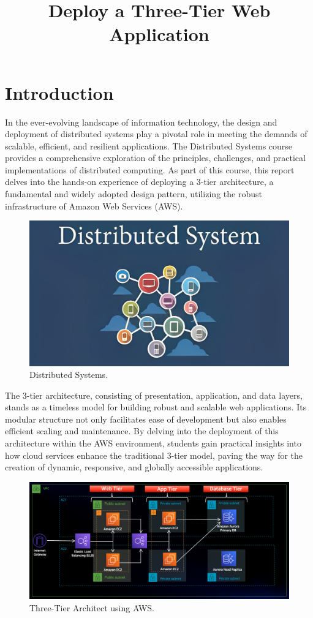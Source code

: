 \documentclass{article}
\title{\huge{Deploy a Three-Tier Web Application}}
\begin{document}
\coverpage%

\tableofcontents

\newpage

\section{Introduction}
In the ever-evolving landscape of information technology, the design and deployment of distributed systems play a pivotal role in meeting the demands of scalable, efficient, and resilient applications. The Distributed Systems course provides a comprehensive exploration of the principles, challenges, and practical implementations of distributed computing. As part of this course, this report delves into the hands-on experience of deploying a 3-tier architecture, a fundamental and widely adopted design pattern, utilizing the robust infrastructure of Amazon Web Services (AWS).\par
\begin{figure}[h]
    \centering
    \includegraphics[width=13cm]{Pictures/Introduction/DSs intro.jpg}
    \caption{Distributed Systems.}
    \label{fig:enter-label}
\end{figure}
The 3-tier architecture, consisting of presentation, application, and data layers, stands as a timeless model for building robust and scalable web applications. Its modular structure not only facilitates ease of development but also enables efficient scaling and maintenance. By delving into the deployment of this architecture within the AWS environment, students gain practical insights into how cloud services enhance the traditional 3-tier model, paving the way for the creation of dynamic, responsive, and globally accessible applications.\par
\begin{figure}[h]
    \centering
    \includegraphics[width = 13cm]{Pictures/Introduction/3TierArch.png}
    \caption{Three-Tier Architect using AWS.}
    \label{fig:enter-label}
\end{figure}
\end{document}
